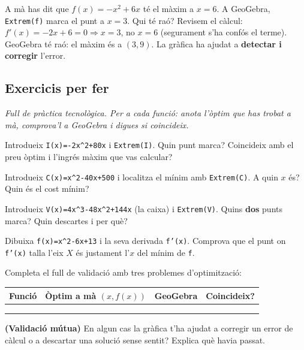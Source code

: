 \begin{exresolt}
A mà has dit que $f(x)=-x^2+6x$ té el màxim a $x=6$. A GeoGebra, \texttt{Extrem(f)}
marca el punt a $x=3$. Qui té raó?
\solucio
Revisem el càlcul: $f'(x)=-2x+6=0\Rightarrow x=3$, no $x=6$ (segurament s'ha confós el
terme). GeoGebra té raó: el màxim és a $(3,9)$. La gràfica ha ajudat a \textbf{detectar
i corregir} l'error.
\end{exresolt}

\subsection{Exercicis per fer}

\noindent\textit{Full de pràctica tecnològica. Per a cada funció: anota l'òptim que has
trobat a mà, comprova'l a GeoGebra i digues si coincideix.}

\begin{exercicis}
\begin{exlist}
  \item Introdueix \texttt{I(x)=-2x\^{}2+80x} i \texttt{Extrem(I)}. Quin punt marca?
        Coincideix amb el preu òptim i l'ingrés màxim que vas calcular?
  \item Introdueix \texttt{C(x)=x\^{}2-40x+500} i localitza el mínim amb
        \texttt{Extrem(C)}. A quin $x$ és? Quin és el cost mínim?
  \item Introdueix \texttt{V(x)=4x\^{}3-48x\^{}2+144x} (la caixa) i \texttt{Extrem(V)}.
        Quins \textbf{dos} punts marca? Quin descartes i per què?
  \item Dibuixa \texttt{f(x)=x\^{}2-6x+13} i la seva derivada \texttt{f'(x)}. Comprova
        que el punt on \texttt{f'(x)} talla l'eix $X$ és justament l'$x$ del mínim de
        \texttt{f}.
  \item Completa el full de validació amb tres problemes d'optimització:
        \begin{center}
        \renewcommand{\arraystretch}{1.4}
        \begin{tabular}{p{3.4cm} p{4.4cm} p{2.4cm} p{1.6cm}}
        \toprule
        \textbf{Funció} & \textbf{Òptim a mà $(x,f(x))$} & \textbf{GeoGebra} & \textbf{Coincideix?} \\
        \midrule
         & & & \\[10pt]
         & & & \\[10pt]
         & & & \\
        \bottomrule
        \end{tabular}
        \end{center}
  \item \textbf{(Validació mútua)} En algun cas la gràfica t'ha ajudat a corregir un
        error de càlcul o a descartar una solució sense sentit? Explica què havia passat.
\end{exlist}
\end{exercicis}

